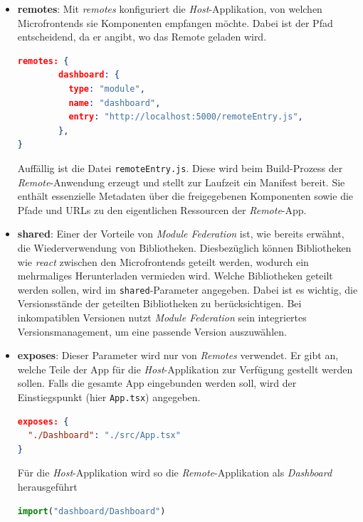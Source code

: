 \begin{itemize}
  \item \textbf{remotes}: Mit \textit{remotes} konfiguriert die \textit{Host}-Applikation, von welchen Microfrontends sie Komponenten empfangen möchte. Dabei ist der Pfad entscheidend, da er angibt, wo das Remote geladen wird.
        \begin{lstlisting}[language=json, caption={Beispiel für die Angabe der Remotes in der Host-App}, label={lst:microfrontends_apps_remotes_konfig}]
remotes: {
        dashboard: {
          type: "module",
          name: "dashboard",
          entry: "http://localhost:5000/remoteEntry.js",
        },
}
\end{lstlisting}
        Auffällig ist die Datei \texttt{remoteEntry.js}. Diese wird beim Build-Prozess der \textit{Remote}-Anwendung erzeugt und stellt zur Laufzeit ein Manifest bereit. Sie enthält essenzielle Metadaten über die freigegebenen Komponenten sowie die Pfade und URLs zu den eigentlichen Ressourcen der \textit{Remote}-App.
  \item \textbf{shared}: Einer der Vorteile von \textit{Module Federation} ist, wie bereits erwähnt, die Wiederverwendung von Bibliotheken. Diesbezüglich können Bibliotheken wie \textit{react} zwischen den Microfrontends geteilt werden, wodurch ein mehrmaliges Herunterladen vermieden wird. Welche Bibliotheken geteilt werden sollen, wird im \texttt{shared}-Parameter angegeben. Dabei ist es wichtig, die Versionsstände der geteilten Bibliotheken zu berücksichtigen. Bei inkompatiblen Versionen nutzt \textit{Module Federation} sein integriertes Versionsmanagement, um eine passende Version auszuwählen.
  \item \textbf{exposes}: Dieser Parameter wird nur von \textit{Remotes} verwendet. Er gibt an, welche Teile der App für die \textit{Host}-Applikation zur Verfügung gestellt werden sollen. Falls die gesamte App eingebunden werden soll, wird der Einstiegspunkt (hier \texttt{App.tsx}) angegeben.
        \begin{lstlisting}[language=json, caption={Beispiel für den expose Parameter}, label={lst:microfrontends_apps_expose_konfig}]
exposes: {
  "./Dashboard": "./src/App.tsx"
}
\end{lstlisting}
        Für die \textit{Host}-Applikation wird so die \textit{Remote}-Applikation als \textit{Dashboard} herausgeführt
        \begin{lstlisting}[language=javascript, caption={Beispiel für den expose Parameter}, label={lst:microfrontends_apps_expose_import}]
import("dashboard/Dashboard")
\end{lstlisting}
\end{itemize}
